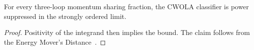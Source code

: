 \begin{proposition}\label{thm:3}
For every three-loop momentum sharing fraction, the CWOLA classifier is
power suppressed in the strongly ordered limit.
\end{proposition}

\begin{proof}
Positivity of the integrand then implies the bound. The claim follows
from the Energy Mover's
Distance~\cite{TPC:0782-Everything-You-Always-Wanted-to-Know-About-Top-Quark-Decays-September-22-2026}.
\end{proof}


